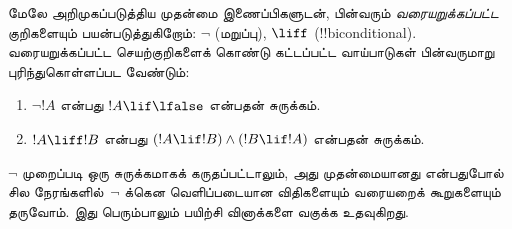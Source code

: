 \documentclass[../../../include/open-logic-section]{subfiles}
\begin{document}
மேலே அறிமுகப்படுத்திய முதன்மை இணைப்பிகளுடன், பின்வரும்
\emph{வரையறுக்கப்பட்ட} குறிகளையும் பயன்படுத்துகிறோம்: $\lnot$ (மறுப்பு),
$\liff$ (!!{biconditional}). வரையறுக்கப்பட்ட செயற்குறிகளைக் கொண்டு
கட்டப்பட்ட வாய்பாடுகள் பின்வருமாறு புரிந்துகொள்ளப்பட வேண்டும்:
\begin{enumerate}
\item $\lnot !A$ என்பது $!A \lif \lfalse$ என்பதன் சுருக்கம்.

\item $!A \liff !B$ என்பது $(!A \lif !B) \land (!B \lif !A)$
என்பதன் சுருக்கம்.
\end{enumerate}

$\lnot$ முறைப்படி ஒரு சுருக்கமாகக் கருதப்பட்டாலும், அது முதன்மையானது
என்பதுபோல் சில நேரங்களில்~$\lnot$ க்கென வெளிப்படையான விதிகளையும் வரையறைக்
கூறுகளையும் தருவோம். இது பெரும்பாலும் பயிற்சி வினாக்களை வகுக்க உதவுகிறது.
\end{document}
